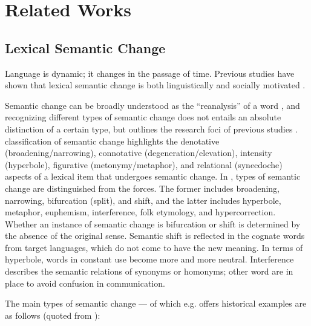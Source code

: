     

\chapter{Related Works}
\label{related_works}

\section{Lexical Semantic Change}
Language is dynamic; it changes in the passage of time. Previous studies have shown that lexical semantic change is both linguistically and socially motivated \parencite{kutuzov2017tracing,kutuzov2018survey,hamilton2016cultural}. 

Semantic change can be broadly understood as the ``reanalysis'' of a word \parencite[650]{fortson2017approach}, and recognizing different types of semantic change does not entails an absolute distinction of a certain type, but outlines the research foci of previous studies \parencites[650]{fortson2017approach}{traugott2017semantic}. \textcite{bloomfield1933language} classification of semantic change highlights the denotative (broadening/narrowing), connotative (degeneration/elevation), intensity (hyperbole), figurative (metonymy/metaphor), and relational (synecdoche) aspects of a lexical item that undergoes semantic change. In \textcite[199-205]{semanticincrowley2010}, types of semantic change are distinguished from the forces. The former includes broadening, narrowing, bifurcation (split), and shift, and the latter includes hyperbole, metaphor, euphemism, interference, folk etymology, and hypercorrection. Whether an instance of semantic change is bifurcation or shift is determined by the absence of the original sense. Semantic shift is reflected in the cognate words from target languages, which do not come to have the new meaning. In terms of hyperbole, words in constant use become more and more neutral. Interference describes the semantic relations of synonyms or homonyms; other word are in place to avoid confusion in communication.

The main types of semantic change — of which e.g. \textcite{traugott2017semantic} offers historical examples are as follows (quoted from \parencite[6]{giulianelli2019lexical}):

